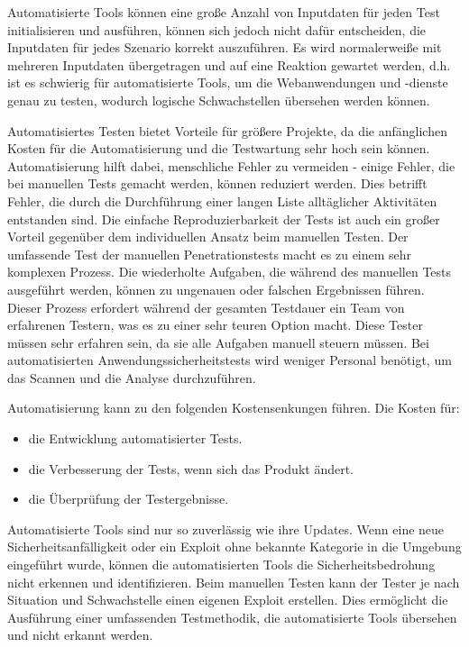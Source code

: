 Automatisierte Tools können eine große Anzahl von Inputdaten für jeden Test initialisieren und ausführen, können sich jedoch nicht dafür entscheiden, die Inputdaten für jedes Szenario korrekt auszuführen. Es wird normalerweiße mit mehreren Inputdaten übergetragen und auf eine Reaktion gewartet werden, d.h. ist es schwierig für automatisierte Tools, um die Webanwendungen und -dienste genau zu testen, wodurch logische Schwachstellen übersehen werden können\cite{packetlabs18}.

Automatisiertes Testen bietet Vorteile für größere Projekte, da die anfänglichen Kosten für die Automatisierung und die Testwartung sehr hoch sein können. Automatisierung hilft dabei, menschliche Fehler zu vermeiden - einige Fehler, die bei manuellen Tests gemacht werden, können reduziert werden. Dies betrifft Fehler, die durch die Durchführung einer langen Liste alltäglicher Aktivitäten entstanden sind. 
Die einfache Reproduzierbarkeit der Tests ist auch ein großer Vorteil gegenüber dem individuellen Ansatz beim manuellen Testen.
Der umfassende Test der manuellen Penetrationstests macht es zu einem sehr komplexen Prozess. Die wiederholte Aufgaben, die während des manuellen Tests ausgeführt werden, können zu ungenauen oder falschen Ergebnissen führen.  Dieser Prozess erfordert während der gesamten Testdauer ein Team von erfahrenen Testern, was es zu einer sehr teuren Option macht. Diese Tester müssen sehr erfahren sein, da sie alle Aufgaben manuell steuern müssen. Bei automatisierten Anwendungssicherheitstests wird weniger Personal benötigt, um das Scannen und die Analyse durchzuführen\cite{autovorteil99}.

Automatisierung kann zu den folgenden Kostensenkungen führen. Die Kosten für\cite{autovorteil99}: 

\begin{itemize} 
	\item die Entwicklung automatisierter Tests.
	\item die Verbesserung der Tests, wenn sich das Produkt ändert.
	\item die Überprüfung der Testergebnisse.
\end{itemize} 

Automatisierte Tools sind nur so zuverlässig wie ihre Updates. Wenn eine neue Sicherheitsanfälligkeit oder ein Exploit ohne bekannte Kategorie in die Umgebung eingeführt wurde, können die automatisierten Tools die Sicherheitsbedrohung nicht erkennen und identifizieren. Beim manuellen Testen kann der Tester je nach Situation und Schwachstelle einen eigenen Exploit erstellen. Dies ermöglicht die Ausführung einer umfassenden Testmethodik, die automatisierte Tools übersehen und nicht erkannt werden\cite{packetlabs18}.

